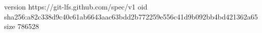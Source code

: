 version https://git-lfs.github.com/spec/v1
oid sha256:a82c338d9c40c61ab6643aac63bdd2b772259e556c41d9b092bb4bd421362a65
size 786528
